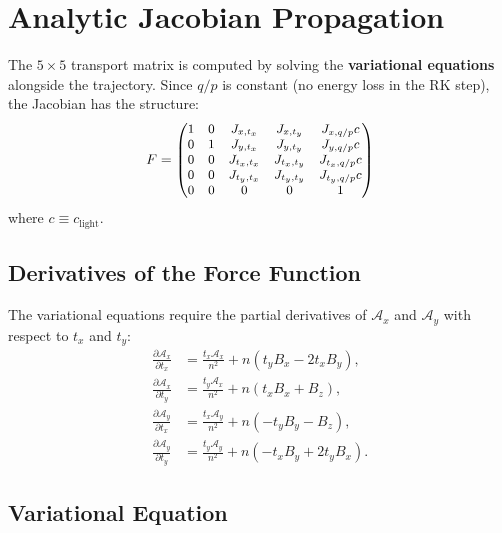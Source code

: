 \documentclass[11pt,a4paper]{article}
\newcommand{\qop}{q/p}
\newcommand{\clgt}{c_\text{light}}
\begin{document}
\section{Analytic Jacobian Propagation}\label{sec:jacobian}

The $5\times5$ transport matrix is computed by solving the \textbf{variational
equations} alongside the trajectory. Since $\qop$ is constant (no energy loss
in the RK step), the Jacobian has the structure:
\begin{equation}\label{eq:jacobian-structure}
  F =
  {\small\begin{pmatrix}
    1 & 0 & J_{x,t_x}   & J_{x,t_y}   & J_{x,\qop}c \\
    0 & 1 & J_{y,t_x}   & J_{y,t_y}   & J_{y,\qop}c \\
    0 & 0 & J_{t_x,t_x} & J_{t_x,t_y} & J_{t_x,\qop}c \\
    0 & 0 & J_{t_y,t_x} & J_{t_y,t_y} & J_{t_y,\qop}c \\
    0 & 0 & 0            & 0            & 1
  \end{pmatrix}}
\end{equation}
where $c \equiv \clgt$.

\subsection{Derivatives of the Force Function}

The variational equations require the partial derivatives of $\mathcal{A}_x$
and $\mathcal{A}_y$ with respect to $t_x$ and $t_y$:
\begin{align}
  \frac{\partial \mathcal{A}_x}{\partial t_x} &= \frac{t_x\mathcal{A}_x}{n^2}
    + n(t_y B_x - 2 t_x B_y), \label{eq:dAxdtx} \\[3pt]
  \frac{\partial \mathcal{A}_x}{\partial t_y} &= \frac{t_y\mathcal{A}_x}{n^2}
    + n(t_x B_x + B_z), \label{eq:dAxdty} \\[3pt]
  \frac{\partial \mathcal{A}_y}{\partial t_x} &= \frac{t_x\mathcal{A}_y}{n^2}
    + n(-t_y B_y - B_z), \label{eq:dAydtx} \\[3pt]
  \frac{\partial \mathcal{A}_y}{\partial t_y} &= \frac{t_y\mathcal{A}_y}{n^2}
    + n(-t_x B_y + 2 t_y B_x). \label{eq:dAydty}
\end{align}

\subsection{Variational Equation}
\end{document}
